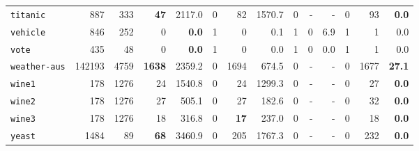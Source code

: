 \begin{tabular}{lccrrrrrrrrrrr}
\texttt{titanic} & \multicolumn{1}{r}{887} & \multicolumn{1}{r}{333}  & \textbf{47} & 2117.0 & 0 & 82 & 1570.7 & 0 & - & - & 0 & 93 & \textbf{0.0}\\
\texttt{vehicle} & \multicolumn{1}{r}{846} & \multicolumn{1}{r}{252}  & 0 & \textbf{0.0} & 1 & 0 & 0.1 & 1 & 0 & 6.9 & 1 & 1 & 0.0\\
\texttt{vote} & \multicolumn{1}{r}{435} & \multicolumn{1}{r}{48}  & 0 & \textbf{0.0} & 1 & 0 & 0.0 & 1 & 0 & 0.0 & 1 & 1 & 0.0\\
\texttt{weather-aus} & \multicolumn{1}{r}{142193} & \multicolumn{1}{r}{4759}  & \textbf{1638} & 2359.2 & 0 & 1694 & 674.5 & 0 & - & - & 0 & 1677 & \textbf{27.1}\\
\texttt{wine1} & \multicolumn{1}{r}{178} & \multicolumn{1}{r}{1276}  & 24 & 1540.8 & 0 & 24 & 1299.3 & 0 & - & - & 0 & 27 & \textbf{0.0}\\
\texttt{wine2} & \multicolumn{1}{r}{178} & \multicolumn{1}{r}{1276}  & 27 & 505.1 & 0 & 27 & 182.6 & 0 & - & - & 0 & 32 & \textbf{0.0}\\
\texttt{wine3} & \multicolumn{1}{r}{178} & \multicolumn{1}{r}{1276}  & 18 & 316.8 & 0 & \textbf{17} & 237.0 & 0 & - & - & 0 & 18 & \textbf{0.0}\\
\texttt{yeast} & \multicolumn{1}{r}{1484} & \multicolumn{1}{r}{89}  & \textbf{68} & 3460.9 & 0 & 205 & 1767.3 & 0 & - & - & 0 & 232 & \textbf{0.0}\\
\bottomrule
\end{tabular}
